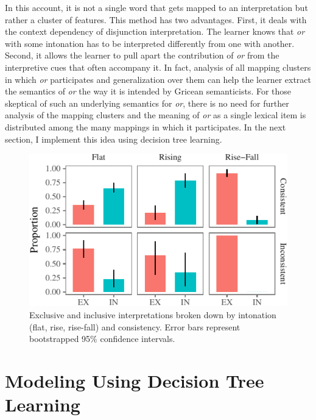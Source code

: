 \documentclass[oneside]{report}
\theoremstyle{definition}
\theoremstyle{definition}
\theoremstyle{definition}
\theoremstyle{remark}
\begin{document}
In this account, it is not a single word that gets mapped to an
interpretation but rather a cluster of features. This method has two
advantages. First, it deals with the context dependency of disjunction
interpretation. The learner knows that \emph{or} with some intonation
has to be interpreted differently from one with another. Second, it
allows the learner to pull apart the contribution of \emph{or} from the
interpretive cues that often accompany it. In fact, analysis of all
mapping clusters in which \emph{or} participates and generalization over
them can help the learner extract the semantics of \emph{or} the way it
is intended by Gricean semanticists. For those skeptical of such an
underlying semantics for \emph{or}, there is no need for further
analysis of the mapping clusters and the meaning of \emph{or} as a
single lexical item is distributed among the many mappings in which it
participates. In the next section, I implement this idea using decision
tree learning.
\begin{figure}[tb]

{\centering \includegraphics{figs/interpretationByIntonationAndConsistency-1} 

}

\caption{Exclusive and inclusive interpretations broken down by intonation (flat, rise, rise-fall) and consistency. Error bars represent bootstrapped 95\% confidence intervals.}\label{fig:interpretationByIntonationAndConsistency}
\end{figure}
\section{Modeling Using Decision Tree Learning}\label{DecisionTrees}
\end{document}
